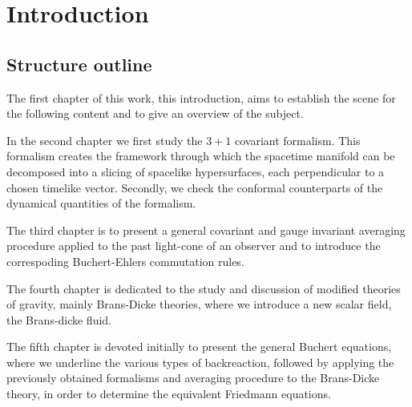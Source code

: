 \chapter{Introduction}







\section{}



\section{Structure outline}

The first chapter of this work, this introduction, aims to establish the scene for the following content and to give an overview of the subject.

In the second chapter we first study the $3+1$ covariant formalism. This formalism creates the framework through which the spacetime manifold can be decomposed into a slicing of spacelike hypersurfaces, each perpendicular to a chosen timelike vector. Secondly, we check the conformal counterparts of the dynamical quantities of the formalism.

The third chapter is to present a general covariant and gauge invariant averaging procedure applied to the past light-cone of an observer and to introduce the correspoding Buchert-Ehlers commutation rules. 

The fourth chapter is dedicated to the study and discussion of modified theories of gravity, mainly Brans-Dicke theories, where we introduce a new scalar field, the Brans-dicke fluid.

The fifth chapter is devoted initially to present the general Buchert equations, where we underline the various types of backreaction, followed by applying the previously obtained formalisms and averaging procedure to the Brans-Dicke theory, in order to determine the equivalent Friedmann equations.


